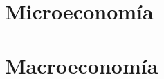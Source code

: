 \documentclass[12pt, a4paper, twoside]{book}
\begin{document}
% 
% 
% 

\chapter{Microeconomía}

% 
% 
% 

% 
% 
% 

% 
% 
% 

% 
% 
% 

% 
% 
% 

% 
% 
% 

% 
% 
% 

% 
% 
% 

% 
% 
% 

\chapter{Macroeconomía}
\end{document}
